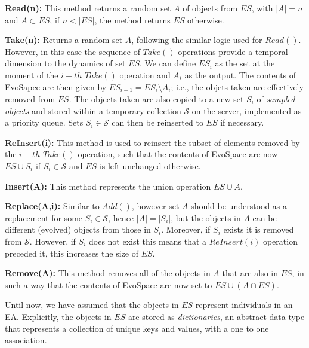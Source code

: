 \documentclass{llncs}
\begin{document}
\textbf{Read(n):} This method returns a random set $A$ of objects from $ES$, with $|A|=n$ and $A\subset ES$, if $n< |ES|$, the method returns $ES$ otherwise.

\textbf{Take(n):} Returns a random set $A$, following the similar logic used for $Read()$.
However, in this case the sequence of $Take()$ operations provide a temporal dimension to the dynamics of set $ES$.
We can define $ES_i$ as the set at the moment of the $i-th$ $Take()$ operation and $A_i$ as the output.
The contents of EvoSapce are then given by $ES_{i+1}= ES_i \setminus A_i$; i.e., the objets taken are effectively removed from $ES$.
The objects taken are also copied to a new set $S_i$ of \emph{sampled objects} and stored
within a temporary collection $\mathcal{S}$ on the server, implemented as a priority queue.
Sets $S_i \in \mathcal{S}$ can then be reinserted to $ES$ if necessary.

\textbf{ReInsert(i):} This method is used to reinsert the subset of elements removed by the $i-th$ $Take()$ operation,
  such that the contents of EvoSpace are now $ES \cup S_i$ if $S_i \in \mathcal{S}$ and $ES$ is left unchanged otherwise.

\textbf{Insert(A):} This method represents the union operation $ES \cup A$.

\textbf{Replace(A,i):} Similar to $Add()$, however set $A$ should be understood as a replacement for
  some $S_i \in \mathcal{S}$, hence $|A| = |S_i|$, but the objects in $A$ can be different (evolved) objects from those in $S_i$.
  Moreover, if $S_i$ exists it is removed from $\mathcal{S}$.
  However, if $S_i$ does not exist this means that a $ReInsert(i)$ operation preceded it, this increases the size of $ES$.

\textbf{Remove(A):} This method removes all of the objects in $A$ that are also in $ES$, in such a way that
  the contents of EvoSpace are now set to $ES \cup (A\cap ES)$.

Until now, we have assumed that the objects in $ES$ represent individuals in an EA.
Explicitly, the objects in $ES$ are stored as \emph{dictionaries}, an abstract data type that represents a collection
of unique keys and values, with a one to one association.
\end{document}
